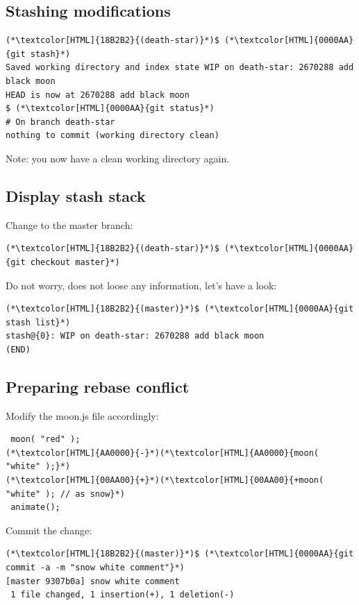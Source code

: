 \subsection{Stashing modifications}
\begin{frame}[fragile]
  \subslidetitle

  \begin{lstlisting}
(*\textcolor[HTML]{18B2B2}{(death-star)}*)$ (*\textcolor[HTML]{0000AA}{git stash}*)
Saved working directory and index state WIP on death-star: 2670288 add black moon
HEAD is now at 2670288 add black moon
$ (*\textcolor[HTML]{0000AA}{git status}*)
# On branch death-star
nothing to commit (working directory clean)
\end{lstlisting}
  Note: you now have a clean working directory again.
\end{frame}

\subsection{Display stash stack}
\begin{frame}[fragile]
  \subslidetitle

  Change to the master branch:
   \begin{lstlisting}
(*\textcolor[HTML]{18B2B2}{(death-star)}*)$ (*\textcolor[HTML]{0000AA}{git checkout master}*)
\end{lstlisting}

  Do not worry,  does not loose any information, let's have a look:

  \begin{lstlisting}
(*\textcolor[HTML]{18B2B2}{(master)}*)$ (*\textcolor[HTML]{0000AA}{git stash list}*)
stash@{0}: WIP on death-star: 2670288 add black moon
(END)
\end{lstlisting}
\end{frame}


\subsection{Preparing rebase conflict}
\begin{frame}[fragile]
  \subslidetitle

  Modify the moon.js file accordingly:
  \begin{lstlisting}
 moon( "red" );
(*\textcolor[HTML]{AA0000}{-}*)(*\textcolor[HTML]{AA0000}{moon( "white" );}*)
(*\textcolor[HTML]{00AA00}{+}*)(*\textcolor[HTML]{00AA00}{+moon( "white" ); // as snow}*)
 animate();
\end{lstlisting}

  Commit the change:
  \begin{lstlisting}
(*\textcolor[HTML]{18B2B2}{(master)}*)$ (*\textcolor[HTML]{0000AA}{git commit -a -m "snow white comment"}*)
[master 9307b0a] snow white comment
 1 file changed, 1 insertion(+), 1 deletion(-)
\end{lstlisting}
\end{frame}

